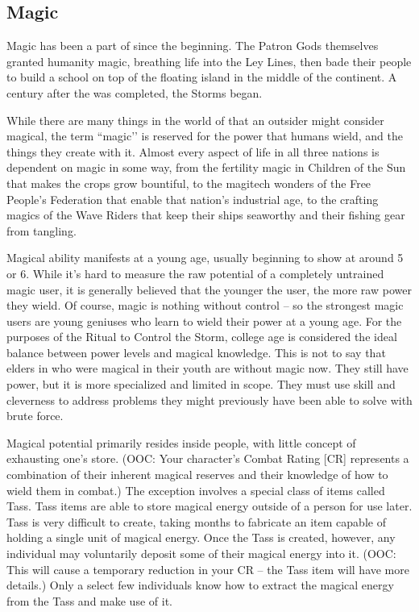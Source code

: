 \documentclass[blue]{GL2020}
\begin{document}
\subsection*{Magic}
Magic has been a part of \pEarth{} since the beginning. The Patron Gods themselves granted humanity magic, breathing life into the Ley Lines, then bade their people to build a school on top of the floating island in the middle of the continent. A century after the \pSchool{} was completed, the Storms began.

While there are many things in the world of \pEarth{} that an outsider might consider magical, the term ``magic'’ is reserved for the power that humans wield, and the things they create with it. Almost every aspect of life in all three nations is dependent on magic in some way, from the fertility magic in Children of the Sun that makes the crops grow bountiful, to the magitech wonders of the Free People's Federation that enable that nation's industrial age, to the crafting magics of the Wave Riders that keep their ships seaworthy and their fishing gear from tangling.

Magical ability manifests at a young age, usually beginning to show at around 5 or 6. While it's hard to measure the raw potential of a completely untrained magic user, it is generally believed that the younger the user, the more raw power they wield. Of course, magic is nothing without control -- so the strongest magic users are young geniuses who learn to wield their power at a young age. For the purposes of the Ritual to Control the Storm, college age is considered the ideal balance between power levels and magical knowledge. This is not to say that elders in \pEarth{} who were magical in their youth are without magic now. They still have power, but it is more specialized and limited in scope. They must use skill and cleverness to address problems they might previously have been able to solve with brute force.

Magical potential primarily resides inside people, with little concept of exhausting one's store. (OOC: Your character's Combat Rating [CR] represents a combination of their inherent magical reserves and their knowledge of how to wield them in combat.) The exception involves a special class of items called Tass. Tass items are able to store magical energy outside of a person for use later. Tass is very difficult to create, taking months to fabricate an item capable of holding a single unit of magical energy. Once the Tass is created, however, any individual may voluntarily deposit some of their magical energy into it. (OOC: This will cause a temporary reduction in your CR – the Tass item will have more details.) Only a select few individuals know how to extract the magical energy from the Tass and make use of it.
\end{document}
